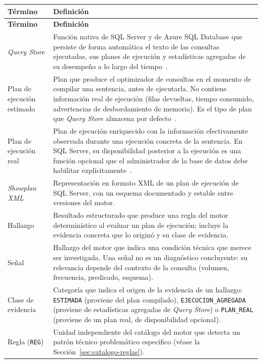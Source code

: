 \documentclass[11pt,a4paper]{report}
\begin{document}
\begin{xltabular}{\linewidth}{@{}lX@{}}
\toprule
\textbf{T\'ermino} & \textbf{Definici\'on} \\
\midrule
\endfirsthead
\toprule
\textbf{T\'ermino} & \textbf{Definici\'on} \\
\midrule
\endhead
\bottomrule
\endlastfoot
\textit{Query Store} & Funci\'on nativa de SQL Server y de Azure SQL Database que persiste de forma autom\'atica el texto de las consultas ejecutadas, sus planes de ejecuci\'on y estad\'isticas agregadas de su desempe\~no a lo largo del tiempo~\cite{R3}. \\
Plan de ejecuci\'on estimado & Plan que produce el optimizador de consultas en el momento de compilar una sentencia, antes de ejecutarla. No contiene informaci\'on real de ejecuci\'on (filas devueltas, tiempo consumido, advertencias de desbordamiento de memoria). Es el tipo de plan que \textit{Query Store} almacena por defecto~\cite{R3,R6}. \\
Plan de ejecuci\'on real & Plan de ejecuci\'on enriquecido con la informaci\'on efectivamente observada durante una ejecuci\'on concreta de la sentencia. En SQL Server, su disponibilidad posterior a la ejecuci\'on es una funci\'on opcional que el administrador de la base de datos debe habilitar expl\'icitamente~\cite{R7}. \\
\textit{Showplan XML} & Representaci\'on en formato XML de un plan de ejecuci\'on de SQL Server, con un esquema documentado y estable entre versiones del motor. \\
Hallazgo & Resultado estructurado que produce una regla del motor determin\'istico al evaluar un plan de ejecuci\'on; incluye la evidencia concreta que lo origin\'o y su clase de evidencia. \\
Se\~nal & Hallazgo del motor que indica una condici\'on t\'ecnica que merece ser investigada. Una se\~nal no es un diagn\'ostico concluyente: su relevancia depende del contexto de la consulta (volumen, frecuencia, predicado, esquema). \\
Clase de evidencia & Categor\'ia que indica el origen de la evidencia de un hallazgo: \texttt{ESTIMADA} (proviene del plan compilado), \texttt{EJECUCION\_AGREGADA} (proviene de estad\'isticas agregadas de \textit{Query Store}) o \texttt{PLAN\_REAL} (proviene de un plan real, de disponibilidad opcional). \\
Regla (\texttt{REG}) & Unidad independiente del cat\'alogo del motor que detecta un patr\'on t\'ecnico problem\'atico espec\'ifico (v\'ease la Secci\'on~\ref{sec:catalogo-reglas}). \\

\end{xltabular}
\end{document}
